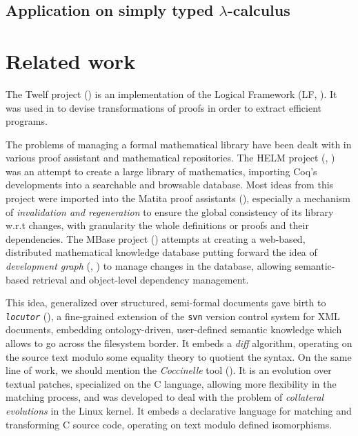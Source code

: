 \documentclass{article}
\begin{document}
\subsection{Application on simply typed $\lambda$-calculus}

\section{Related work}
\label{rw}

The \textsf{Twelf} project (\cite{pfenning1999system}) is an
implementation of the Logical Framework (LF,
\cite{harper1993framework}). It was used in \cite{anderson1993program}
to devise transformations of proofs in order to extract efficient
programs.

The problems of managing a formal mathematical library have been dealt
with in various proof assistant and mathematical repositories. The
HELM project (\cite{asperti2000content}, \cite{asperti2006content})
was an attempt to create a large library of mathematics, importing
\textsf{Coq}'s developments into a searchable and browsable database.
Most ideas from this project were imported into the \textsf{Matita}
proof assistants (\cite{asperti2007hop}), especially a mechanism of
\emph{invalidation and regeneration} to ensure the global consistency
of its library w.r.t changes, with granularity the whole definitions
or proofs and their dependencies. The MBase project
(\cite{kohlhase2001mbase}) attempts at creating a web-based,
distributed mathematical knowledge database putting forward the idea
of \emph{development graph} (\cite{hutter2000management},
\cite{autexier2000towards}) to manage changes in the database,
allowing semantic-based retrieval and object-level dependency
management.

This idea, generalized over structured, semi-formal documents gave
birth to \texttt{\it locutor} (\cite{muller2008fine}), a fine-grained
extension of the \texttt{svn} version control system for XML
documents, embedding ontology-driven, user-defined semantic knowledge
which allows to go across the filesystem border. It embeds a
\emph{diff} algorithm, operating on the source text modulo some
equality theory to quotient the syntax. On the same line of work, we
should mention the \emph{Coccinelle} tool
(\cite{padioleau2008documenting}). It is an evolution over textual
patches, specialized on the C language, allowing more flexibility in
the matching process, and was developed to deal with the problem of
\emph{collateral evolutions} in the Linux kernel. It embeds a
declarative language for matching and transforming C source code,
operating on text modulo defined isomorphisms.
\end{document}
